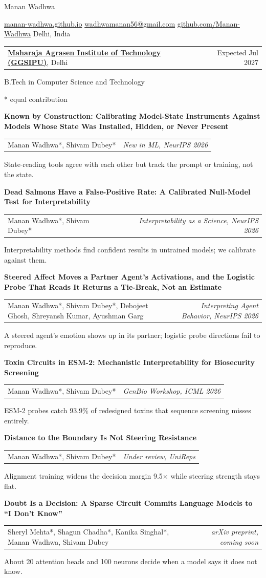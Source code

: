 \documentclass[letterpaper,11pt]{article}
\makeatletter
\newcommand{\sect}[1]{\vspace{13pt}{\scshape\large #1}\par\vspace{5pt}}
\newcommand{\row}[2]{\begin{tabularx}{\textwidth}{@{}>{\raggedright\arraybackslash}X@{\hspace{10pt}}r@{}}#1 & #2\end{tabularx}\par}
\newcommand{\paper}[4]{%
  {\bfseries #1\par}\vspace{1pt}
  {\small\row{#2}{\itshape #3}}\vspace{1pt}
  {\small\color{muted}#4\par}\vspace{7pt}}
\makeatother
\begin{document}
{\fontsize{22}{26}\selectfont Manan Wadhwa}\par\vspace{5pt}
{\small\color{muted}
\href{https://manan-wadhwa.github.io}{manan-wadhwa.github.io} \quad
\href{mailto:wadhwamanan56@gmail.com}{wadhwamanan56@gmail.com} \quad
\href{https://github.com/Manan-Wadhwa}{github.com/Manan-Wadhwa} \quad
Delhi, India\par}

\sect{Education}
\row{\href{https://mait.ac.in}{\textbf{Maharaja Agrasen Institute of Technology (GGSIPU)}}, Delhi}{Expected Jul 2027}
B.Tech in Computer Science and Technology \par

\sect{Research}
{\small\color{muted}* equal contribution}\par\vspace{5pt}

\paper{Known by Construction: Calibrating Model-State Instruments Against Models Whose State Was Installed, Hidden, or Never Present}
 {Manan Wadhwa*, Shivam Dubey*}{New in ML, NeurIPS 2026}
 {State-reading tools agree with each other but track the prompt or training, not the state.}

\paper{Dead Salmons Have a False-Positive Rate: A Calibrated Null-Model Test for Interpretability}
 {Manan Wadhwa*, Shivam Dubey*}{Interpretability as a Science, NeurIPS 2026}
 {Interpretability methods find confident results in untrained models; we calibrate against them.}

\paper{Steered Affect Moves a Partner Agent's Activations, and the Logistic Probe That Reads It Returns a Tie-Break, Not an Estimate}
 {Manan Wadhwa*, Shivam Dubey*, Debojeet Ghosh, Shreyansh Kumar, Ayushman Garg}{Interpreting Agent Behavior, NeurIPS 2026}
 {A steered agent's emotion shows up in its partner; logistic probe directions fail to reproduce.}

\paper{Toxin Circuits in ESM-2: Mechanistic Interpretability for Biosecurity Screening}
 {Manan Wadhwa*, Shivam Dubey*}{GenBio Workshop, ICML 2026}
 {ESM-2 probes catch 93.9\% of redesigned toxins that sequence screening misses entirely.}

\paper{Distance to the Boundary Is Not Steering Resistance}
 {Manan Wadhwa*, Shivam Dubey*}{Under review, UniReps}
 {Alignment training widens the decision margin 9.5$\times$ while steering strength stays flat.}

\paper{Doubt Is a Decision: A Sparse Circuit Commits Language Models to ``I Don't Know''}
 {Sheryl Mehta*, Shagun Chadha*, Kanika Singhal*, Manan Wadhwa, Shivam Dubey}{arXiv preprint, coming soon}
 {About 20 attention heads and 100 neurons decide when a model says it does not know.}
\end{document}

